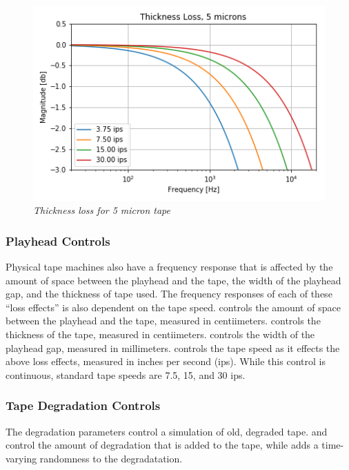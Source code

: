 \documentclass[landscape,twocolumn,a5paper]{manual}
\begin{document}
%
\begin{figure}[ht]
    \center
    \includegraphics[width=0.85\columnwidth]{../Simulations/LossEffects/speed_thickness.png}
    \caption{\label{thick_loss}{\it Thickness loss for 5 micron tape}}
\end{figure}

\subsubsection{Playhead Controls}
Physical tape machines also have a frequency response that
is affected by the amount of space between the playhead and
the tape, the width of the playhead gap, and the thickness
of tape used. The frequency responses of each of these ``loss
effects'' is also dependent on the tape speed.
\newpar
{}
controls the amount of space between the playhead and the tape,
measured in centiimeters.
\newpar
{} controls the thickness
of the tape, measured in centiimeters.
\newpar
{} controls
the width of the playhead gap, measured in millimeters.
\newpar
{}
controls the tape speed as it effects the above loss effects,
measured in inches per second (ips). While this control is
continuous, standard tape speeds are 7.5, 15, and 30 ips.


\subsubsection{Tape Degradation Controls}
The degradation parameters control a simulation of old, degraded
tape.  and  control the amount
of degradation that is added to the tape, while 
adds a time-varying randomness to the degradatation.

\vspace{2em}
\end{document}
